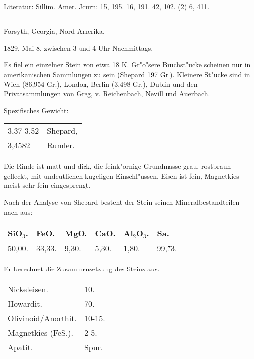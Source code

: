 \documentclass[a4paper, 11pt, oneside]{article}
\begin{document}
\normalsize
Literatur: Sillim. Amer. Journ: 15, 195. 16, 191. 42, 102. (2) 6, 411.

\subsection{}
\LARGE
\paragraph{}
Forsyth, Georgia, Nord-Amerika.

1829, Mai 8, zwischen 3 und 4 Uhr Nachmittags.

Es fiel ein einzelner Stein von etwa 18 K. Gr"o"sere Bruchst"ucke scheinen nur in amerikanischen Sammlungen zu sein (Shepard 197 Gr.). Kleinere St"ucke sind in Wien (86,954 Gr.), London, Berlin (3,498 Gr.), Dublin und den Privatsammlungen von Greg, v. Reichenbach, Nevill und Auerbach.

Spezifisches Gewicht:
\begin{table}[!ht]
    \centering\swabfamily\Large
    \begin{tabular}{l l}
        3,37-3,52 & Shepard,\\
        3,4582 & Rumler.
    \end{tabular}
\end{table}

Die Rinde ist matt und dick, die feink"ornige Grundmasse grau, rostbraun gefleckt, mit undeutlichen kugeligen Einschl"ussen. Eisen ist fein, Magnetkies meist sehr fein eingesprengt.

Nach der Analyse von Shepard besteht der Stein seinen Mineralbestandteilen nach aus:
\begin{table}[!ht]
    \centering\swabfamily\Large
    \begin{tabular}{l l l l l l}
        SiO$_{3}$. & FeO. & MgO. & CaO. & Al$_{2}$O$_{3}$. & Sa. \\ \hline
        50,00. & 33,33. & 9,30. & 5,30. & 1,80. & 99,73. \\
    \end{tabular}
\end{table}

Er berechnet die Zusammensetzung des Steins aus:
\begin{table}[H]
    \centering\swabfamily\Large
    \begin{tabular}{l l}
        Nickeleisen. & 10. \\
        Howardit. & 70. \\
        Olivinoid/Anorthit. & 10-15. \\
        Magnetkies (FeS.). & 2-5.  \\
        Apatit. & Spur. \\
    \end{tabular}
\end{table}
\end{document}
